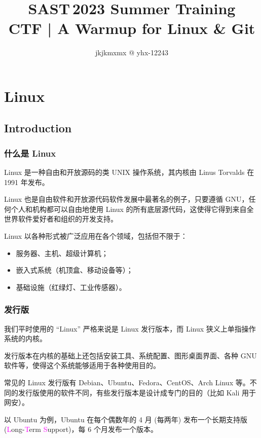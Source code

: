 \documentclass{article}
\title{SAST\,2023 Summer Training\\CTF | A Warmup for Linux \& Git}
\author{jkjkmxmx @ yhx-12243}
\begin{document}
	\maketitle
	\let\labelitemi\labelitemiii

	\section{Linux}

	\subsection{Introduction}

	\subsubsection{什么是 Linux}

	Linux 是一种自由和开放源码的类 UNIX 操作系统，其内核由 Linus Torvalds 在 1991 年发布。

	Linux 也是自由软件和开放源代码软件发展中最著名的例子，只要遵循 GNU，任何个人和机构都可以自由地使用 Linux 的所有底层源代码，这使得它得到来自全世界软件爱好者和组织的开发支持。

	Linux 以各种形式被广泛应用在各个领域，包括但不限于：
	\begin{itemize}
		\itemsep0pt
		\item 服务器、主机、超级计算机；
		\item 嵌入式系统（机顶盒、移动设备等）；
		\item 基础设施（红绿灯、工业传感器）。\cite{net9-linux}
	\end{itemize}

	\subsubsection{发行版}

	我们平时使用的 ``Linux'' 严格来说是 Linux 发行版本，而 Linux 狭义上单指操作系统的内核。

	发行版本在内核的基础上还包括安装工具、系统配置、图形桌面界面、各种 GNU 软件等，使得这个系统能够适用于各种使用目的。

	常见的 Linux 发行版有 Debian、Ubuntu、Fedora、CentOS、Arch Linux 等。不同的发行版使用的软件不同，有些发行版本是设计成专门的目的（比如 Kali 用于网安）。\cite{net9-linux}

	以 Ubuntu 为例，Ubuntu 在每个偶数年的 4 月 (每两年) 发布一个长期支持版 (\textcolor{fuchsia}Long-\textcolor{fuchsia}Term \textcolor{fuchsia}Support)，每 6 个月发布一个版本。
\end{document}
